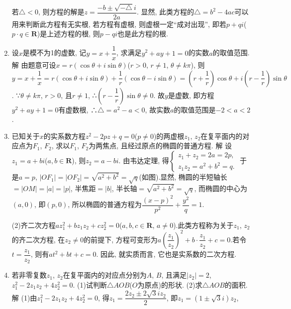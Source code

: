 \documentclass[10pt,a4paper]{article}
\begin{document}
\begin{enumerate}[1.]
若$\triangle <0$, 则方程的解是$z=\dfrac{-b\pm \sqrt {-\triangle }i}{2a}$.
显然, 此类方程的$\triangle =b^2-4ac$可以用来判断此方程有无实根, 若方程有虚根, 则虚根一定``成对出现'', 即若$p+qi$($p\cdot q\in \mathbf{R}$)是上述方程的根, 则$p-qi$也是此方程的根.
\item 设$x$是模不为1的虚数, 记$y=x+\dfrac 1x$, 求满足$y^2+ay+1=0$的实数$a$的取值范围.
解  由题意可设$x=r(\cos \theta +i\sin \theta)$($r>0$, $r\ne 1$, $\theta \ne k\pi$),
则$y=x+\dfrac 1x=r(\cos \theta +i\sin \theta)+\dfrac 1r(\cos \theta -i\sin \theta)=(r+\dfrac 1r)\cos \theta +i(r-\dfrac 1r)\sin \theta$.
∵$\theta \ne k\pi$, $r>0$, 且$r\ne 1$, ∴$(r-\dfrac 1r)\sin \theta \ne 0$.
故$y$是虚数, 即方程$y^2+ay+1=0$有虚数根, ∴$\triangle =a^2-a<0$,
故实数$a$的取值范围是$-2<a<2$.
\item 已知关于$x$的实系数方程$z^2-2pz+q=0$($p\ne 0$)的两虚根$z_1$, $z_2$在复平面内的对应点为$F_1$, $F_2$, 求以$F_1$, $F_2$为两焦点, 且经过原点的椭圆的普通方程.
解  设$z_1=a+bi$($a,b\in \mathbf{R}$), 则$z_2=a-bi$.
由韦达定理, 得$\begin{cases} z_1+z_2=2a=2p, \\ z_1z_2=a^2+b^2=q. \end{cases}$
于是$a=p$, $|OF_1|=|OF_2|=\sqrt {a^2+b^2}=\sqrt q$(如图).显然, 椭圆的半短轴长$=|OM|=|a|=|p|$, 半焦距$=|b|$, 半长轴$=\sqrt {a^2+b^2}=\sqrt q$, 而椭圆的中心为$(a,0)$, 即$(p,0)$, 所以椭圆的普通方程为$\dfrac{{{(x-p)}^2}}{p^2}+\dfrac{y^2}q=1$.
\begin{center}
\end{center}
(2)齐二次方程$az_1^2+bz_1z_2+cz_2^2=0$($a,b,c\in \mathbf{R}$, $a\ne 0$).此类方程称为关于$z_1$, $z_2$的齐二次方程, 在$z_2\ne 0$的前提下, 方程可变形为$a(\dfrac{z_1}{z_2})^2+b\cdot \dfrac{z_1}{z_2}+c=0$.若令$t=\dfrac{z_1}{z_2}$, 则有$at^2+bt+c=0$.
因此, 就实质而言, 它也是实系数的二次方程.
\item 若非零复数$z_1$, $z_2$在复平面内的对应点分别为$A$, $B$, 且满足$|z_2|=2$, $z_1^2-2z_1z_2+4z_2^2=0$.
(1)试判断$\triangle AOB$($O$为原点)的形状.	(2)求$\triangle AOB$的面积.
解  (1)由$z_1^2-2z_1z_2+4z_2^2=0$, 得$z_1=\dfrac{2z_2\pm 2\sqrt 3iz_2}2$, 即$z_1=(1\pm \sqrt 3i)z_2$,

\end{enumerate}
\end{document}

